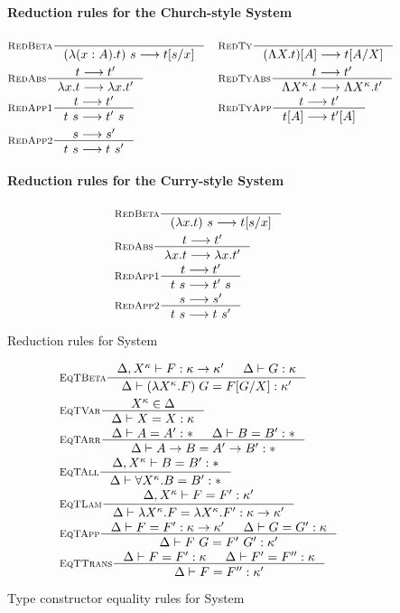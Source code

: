 \begin{figure}
\paragraph{Reduction rules for the Church-style System \Fw}
\begin{align*}
& \inference[\sc RedBeta]{}{(\l(x:A).t)~s --> t[s/x]}
&&\inference[\sc RedTy]{}{(\L X   .t)[A] --> t[A/X]} \\
& \inference[\sc RedAbs]{t --> t'}{\l x   .t --> \l x   .t'}
&&\inference[\sc RedTyAbs]{t --> t'}{\L X^\kappa   .t --> \L X^\kappa   .t'} \\
& \inference[\sc RedApp1]{t --> t'}{t~s --> t'~s}
&&\inference[\sc RedTyApp]{t --> t'}{t[A] --> t'[A]} \\
& \inference[\sc RedApp2]{s --> s'}{t~s --> t~s'}
\end{align*}
\paragraph{Reduction rules for the Curry-style System \Fw}
\begin{align*}
& \inference[\sc RedBeta]{}{(\l x   .t)~s --> t[s/x]} \\
& \inference[\sc RedAbs]{t --> t'}{\l x   .t --> \l x   .t'} \\
& \inference[\sc RedApp1]{t --> t'}{t~s --> t'~s} \\
& \inference[\sc RedApp2]{s --> s'}{t~s --> t~s'}
\end{align*}
\caption{Reduction rules for System \Fw}
\label{fig:redfw}
\end{figure}

\begin{figure}
\begin{align*}
& \inference[\sc EqTBeta]
        {\Delta,X^\kappa |- F : \kappa -> \kappa' & \Delta |- G : \kappa}
        {\Delta |- (\l X^\kappa.F)\;G = F[G/X] : \kappa'} \\
& \inference[\sc EqTVar]{X^\kappa \in \Delta}{\Delta |- X = X : \kappa} \\
& \inference[\sc EqTArr]{\Delta |- A=A':* & \Delta |- B=B':*}
                        {\Delta |- A -> B=A' -> B':*} \\
& \inference[\sc EqTAll]{\Delta,X^\kappa |- B=B':*}
                        {\Delta |- \forall X^\kappa.B=B':*} \\
& \inference[\sc EqTLam]
        {\Delta,X^\kappa |- F=F':\kappa'}
        {\Delta |- \l X^\kappa.F=\l X^\kappa.F':\kappa -> \kappa'} \\
& \inference[\sc EqTApp]
        {\Delta |- F=F' : \kappa -> \kappa' & \Delta |- G=G' : \kappa}
        {\Delta |- F ~ G = F' ~ G' : \kappa'} \\
& \inference[\sc EqTTrans]
        {\Delta |- F=F' : \kappa & \Delta |- F'=F'' : \kappa}
        {\Delta |- F=F'' : \kappa'}
\end{align*}
\caption{Type constructor equality rules for System \Fw}
\label{fig:eqtyfw}
\end{figure}

